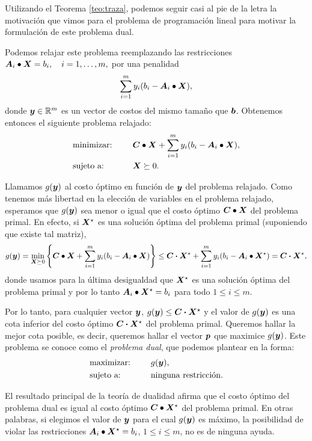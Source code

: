 Utilizando el Teorema \ref{teo:traza}, podemos seguir casi al pie de la letra la motivación que vimos para el problema de programación lineal para motivar la formulación de este problema dual.

Podemos relajar este problema reemplazando las restricciones $\bm{A}_i \bullet \bm{X} = b_i, \quad i = 1, \dots, m,$ por una penalidad $$\sum_{i=1}^m y_i (b_i - \bm{A}_i \bullet \bm{X}),$$
donde $\bm{y} \in \mathbb{R}^m$ es un vector de costos del mismo tamaño que $\bm{b}$. Obtenemos entonces el siguiente problema relajado:
\begin{alignat*}{2}
  & \text{minimizar: } & & \bm{C} \bullet \bm{X} + \sum_{i=1}^m y_i (b_i - \bm{A}_i \bullet \bm{X}), \\
   & \text{sujeto a: } & \quad & \bm{X} \succeq 0.
\end{alignat*}

Llamamos $g(\bm{y})$ al costo óptimo en función de $\bm{y}$ del problema relajado. Como tenemos más libertad en la elección de variables en el problema relajado, esperamos que $g(\bm{y})$ sea menor o igual que el costo óptimo $\bm{C} \bullet \bm{X}$ del problema primal. En efecto, si $\bm{X}^\star$ es una solución óptima del problema primal (suponiendo que existe tal matriz),
$$
g(\bm{y}) = \min_{\bm{X} \succeq 0} \left\{ \bm{C} \bullet \bm{X} + \sum_{i=1}^m y_i (b_i - \bm{A}_i \bullet \bm{X}) \right\} \le \bm{C} \boldsymbol{\cdot} \bm{X}^\star + \sum_{i=1}^m y_i (b_i - \bm{A}_i \bullet \bm{X}^\star) = \bm{C} \boldsymbol{\cdot} \bm{X}^\star,
$$
donde usamos para la última desigualdad que $\bm{X}^\star$ es una solución óptima del problema primal y por lo tanto $\bm{A}_i \bullet \bm{X}^\star = b_i$ para todo $1 \le i \le m$.

Por lo tanto, para cualquier vector $\bm{y}$, $g(\bm{y}) \le \bm{C} \boldsymbol{\cdot} \bm{X}^\star$ y el valor de $g(\bm{y})$ es una cota inferior del costo óptimo $\bm{C} \boldsymbol{\cdot} \bm{X}^\star$ del problema primal. Queremos hallar la mejor cota posible, es decir, queremos hallar el vector $\bm{p}$ que maximice $g(\bm{y})$. Este problema se conoce como el \emph{problema dual}, que podemos plantear en la forma:
\begin{alignat*}{2}
  & \text{maximizar: } & & g(\bm{y}), \\
   & \text{sujeto a: } & \quad & \text{ninguna restricción}.
\end{alignat*}

El resultado principal de la teoría de dualidad afirma que el costo óptimo del problema dual es igual al costo óptimo $\bm{C} \bullet \bm{X}^\star$ del problema primal. En otras palabras, si elegimos el valor de $\bm{y}$ para el cual $g(\bm{y})$ es máximo, la posibilidad de violar las restricciones $\bm{A}_i \bullet \bm{X}^\star = b_i$, $1 \le i \le m$, no es de ninguna ayuda.

